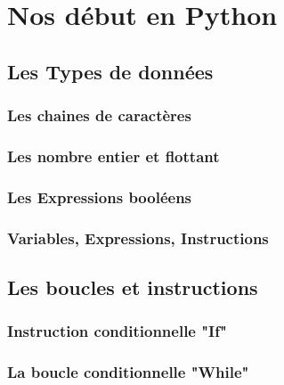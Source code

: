 \part{Nos début en Python}

\chapter{Les Types de données}

\section*{Les chaines de caractères} \label{sec:Chaine}

\section*{Les nombre entier et flottant} \label{sec:nombre}

\section*{Les Expressions booléens} \label{sec:booleens}

\section*{Variables, Expressions, Instructions} \label{sec:VEX}

\chapter{Les boucles et instructions}

\section*{Instruction conditionnelle "If"} \label{sec:If}

\section*{La boucle conditionnelle "While"} \label{sec:While}

